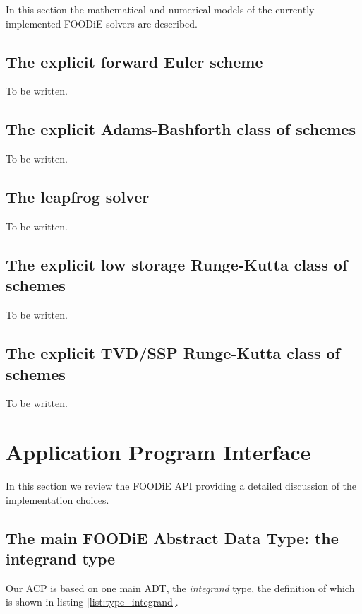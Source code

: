 \documentclass[pdftex,preprint,3p,times,numbers]{elsarticle}
\begin{document}
In this section the mathematical and numerical models of the currently implemented FOODiE solvers are described.

\subsection{The explicit forward Euler scheme}

{\color{red} To be written.}

\subsection{The explicit Adams-Bashforth class of schemes}

{\color{red} To be written.}

\subsection{The leapfrog solver}

{\color{red} To be written.}

\subsection{The explicit low storage Runge-Kutta class of schemes}

{\color{red} To be written.}

\subsection{The explicit TVD/SSP Runge-Kutta class of schemes}

{\color{red} To be written.}

\clearpage

\section{Application Program Interface}\label{sec:API}

In this section we review the FOODiE API providing a detailed discussion of the implementation choices.

\subsection{The main FOODiE Abstract Data Type: the integrand type}
Our ACP is based on one main ADT, the \emph{integrand} type, the definition of which is shown in listing \ref{list:type_integrand}.
\end{document}
